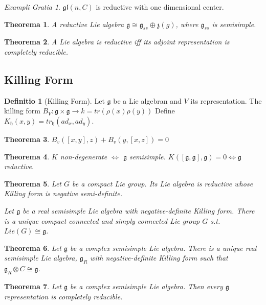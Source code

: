 \documentclass[12pt, a4paper]{article}
\newtheorem{theorem}{Theorema}[section]
\theoremstyle{definition}
\newtheorem{definition}{Definitio}[section]
\theoremstyle{remark}
\newtheorem{example}{Exampli Gratia}[section]
\newcommand{\gl}{\mathfrak{gl}}
\newcommand{\mf}[1]{\mathfrak{#1}}
\begin{document}
\begin{example}
	$\gl(n, C)$ is reductive with one dimensional center.
\end{example}

\begin{theorem}
	A reductive Lie algebra $\mf{g} \cong \mf{g}_{ss} \oplus \mf{z}(g)$, where $\mf{g}_{ss}$ is semisimple.
\end{theorem}

\begin{theorem}
	A Lie algebra is reductive iff its adjoint representation is completely reducible.
\end{theorem}

\subsection{Killing Form}
\begin{definition}[Killing Form]
	Let $\mf{g}$ be a Lie algebran and $V$ its representation.
	The killing form $B_V: \mf{g} \times \mf{g} \rightarrow  k = tr(\rho(x)\rho(y))$ 
	Define $K_{\mf{h}}(x,y) = tr_{\mf{h}}(ad_x, ad_y)$.
\end{definition}

\begin{theorem}
	$B_v([x,y],z) + B_v(y, [x,z]) = 0$
\end{theorem}

\begin{theorem}
	$K$ non-degenerate $\iff$ $\mf{g}$ semisimple.
	$K([\mf{g}, \mf{g}], \mf{g}) =0 \iff \mf{g}$ reductive. 
\end{theorem}

\begin{theorem}
	Let $G$ be a compact Lie group. Its Lie algebra is reductive whose Killing form is negative semi-definite.

	Let $\mf{g}$ be a real semisimple Lie algebra with negative-definite Killing form. There is a unique compact connected and simply connected Lie group $G$ s.t. $Lie(G) \cong \mf{g}$.
\end{theorem}

\begin{theorem}
	Let $\mf{g}$ be a complex semisimple Lie algebra. There is a unique real semisimple Lie algebra, $\mf{g}_R$ with negative-definite Killing form such that $\mf{g}_R \otimes C \cong \mf{g}$.
\end{theorem}

\begin{theorem}
	Let $\mf{g}$ be a complex semisimple Lie algebra. Then every $\mf{g}$ representation is completely reducible.
\end{theorem}
\end{document}
